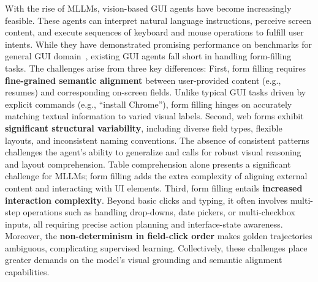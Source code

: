\documentclass[sigconf, screen, review]{acmart}
\begin{document}
With the rise of MLLMs\cite{arlt21icml, jlbb22icml, hlvi23nips, pwqv24corr}, vision-based GUI agents have become increasingly feasible\cite{lzst24iclr, psfp23nips, whca24cvpr, kcsh24acl}.
These agents can interpret natural language instructions, perceive screen content, and execute sequences of keyboard and mouse operations to fulfill user intents.
While they have demonstrated promising performance on benchmarks for general GUI domain~\cite{tswo17icml, craa23nips, jzai24emnlp}, existing GUI agents fall short in handling form-filling tasks.
The challenges arise from three key differences:
First, form filling requires \textbf{fine-grained semantic alignment} between user-provided content (e.g., resumes) and corresponding on-screen fields. Unlike typical GUI tasks driven by explicit commands (e.g., ``install Chrome''), form filling hinges on accurately matching textual information to varied visual labels.
Second, web forms exhibit \textbf{significant structural variability}, including diverse field types, flexible layouts, and inconsistent naming conventions.
The absence of consistent patterns challenges the agent’s ability to generalize and calls for robust visual reasoning and layout comprehension. 
Table comprehension alone presents a significant challenge \cite{zhao24nips, li25www, zheng24acl} for MLLMs; form filling adds the extra complexity of aligning external content and interacting with UI elements.
Third, form filling entails \textbf{increased interaction complexity}.
Beyond basic clicks and typing, it often involves multi-step operations such as handling drop-downs, date pickers, or multi-checkbox inputs, all requiring precise action planning and interface-state awareness.
Moreover, the \textbf{non-determinism in field-click order} makes golden trajectories ambiguous, complicating supervised learning.
Collectively, these challenges place greater demands on the model’s visual grounding and semantic alignment capabilities.


\end{document}
